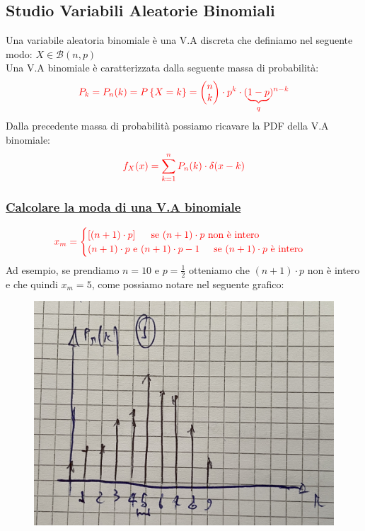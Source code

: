 \documentclass{article}
\begin{document}
\subsection{Studio Variabili Aleatorie Binomiali}
Una variabile aleatoria binomiale è una V.A discreta che definiamo nel seguente modo: $X \in \mathcal{B}(n,p)$ \\
Una V.A binomiale è caratterizzata dalla seguente massa di probabilità:
\[\color{red}P_k = P_n(k)= P \left\{X = k \right\} = \begin{pmatrix} n \\ k \end{pmatrix} \cdot p^k \cdot (\underset{q}{\underbrace{1-p}})^{n-k}\]
Dalla precedente massa di probabilità possiamo ricavare la PDF della V.A binomiale:
\[\color{red} f_X(x) = \sum_{k=1}^{n} P_n(k) \cdot \delta(x-k)\]
\subsubsection{\underline{Calcolare la moda di una V.A binomiale}}
\[\color{red}
x_m = \begin{cases}
\left[(n+1) \cdot p\right] \;\;\;\;\text{ se } (n+1)\cdot p \text{ non è intero} \\
(n+1) \cdot p \text{ e } (n+1)\cdot p -1 \;\;\;\;\text{ se } (n+1)\cdot p \text{ è intero}
\end{cases}\]
Ad esempio, se prendiamo $n = 10$ e $p = \frac 12$ otteniamo che $(n+1)\cdot p$ non è intero e che quindi $x_m = 5$, come possiamo notare nel seguente grafico:
\begin{figure}[ht]
\centering
\includegraphics[scale=0.10]{images/64.ModaBinDeltaNonInt.jpeg}
\end{figure} ~\\
\end{document}
